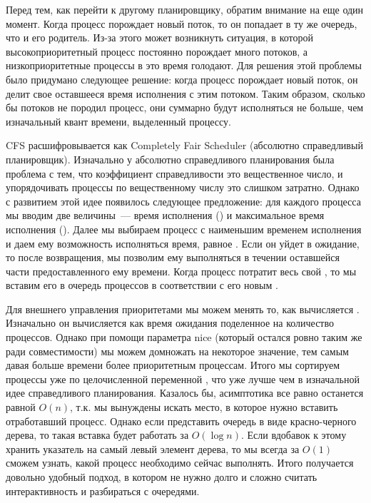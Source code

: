 Перед тем, как перейти к другому планировщику, обратим внимание на еще один
момент. Когда процесс порождает новый поток, то он попадает в ту же очередь, что
и его родитель. Из-за этого может возникнуть ситуация, в которой
высокоприоритетный процесс постоянно порождает много потоков, а
низкоприоритетные процессы в это время голодают. Для решения этой проблемы было
придумано следующее решение: когда процесс порождает новый поток, он делит свое
оставшееся время исполнения с этим потоком. Таким образом, сколько бы потоков не
породил процесс, они суммарно будут исполняться не больше, чем изначальный квант
времени, выделенный процессу.


CFS расшифровывается как Completely Fair Scheduler (абсолютно справедливый
планировщик). Изначально у абсолютно справедливого планирования была проблема с
тем, что коэффициент справедливости это вещественное число, и упорядочивать
процессы по вещественному числу это слишком затратно. Однако с развитием этой
идее появилось следующее предложение: для каждого процесса мы вводим две
величины~--- время исполнения (\exectime) и максимальное время исполнения
(\maxexectime). Далее мы выбираем процесс с наименьшим временем исполнения и
даем ему возможность исполняться время, равное \maxexectime. Если он уйдет в
ожидание, то после возвращения, мы позволим ему выполняться в течении оставшейся
части предоставленного ему времени. Когда процесс потратит весь свой
\maxexectime, то мы вставим его в очередь процессов в соответствии с его новым
\exectime.

Для внешнего управления приоритетами мы можем менять то, как вычисляется
\maxexectime. Изначально он вычисляется как время ожидания поделенное на
количество процессов. Однако при помощи параметра nice (который остался ровно
таким же ради совместимости) мы можем домножать \maxexectime на некоторое
значение, тем самым давая больше времени более приоритетным процессам. Итого мы
сортируем процессы уже по целочисленной переменной \exectime, что уже лучше чем
в изначальной идее справедливого планирования. Казалось бы, асимптотика все
равно останется равной \(O(n)\), т.к. мы вынуждены искать место, в которое нужно
вставить отработавший процесс. Однако если представить очередь в виде
красно-черного дерева, то такая вставка будет работать за \(O(\log n)\). Если
вдобавок к этому хранить указатель на самый левый элемент дерева, то мы всегда
за \(O(1)\) сможем узнать, какой процесс необходимо сейчас выполнять. Итого
получается довольно удобный подход, в котором не нужно долго и сложно считать
интерактивность и разбираться с очередями.

